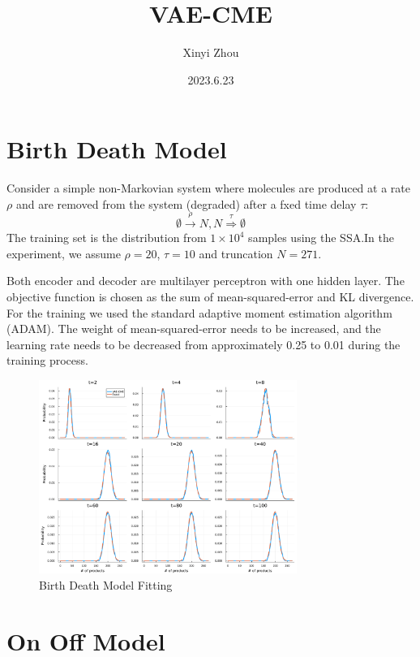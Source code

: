 \documentclass[a4paper,10pt]{article}
\title{VAE-CME}
\author{Xinyi Zhou}
\date{2023.6.23}
\begin{document}
\tableofcontents
\maketitle

\section{Birth Death Model}
Consider a simple non-Markovian system where molecules are produced at a rate $\rho$ and are removed from the system (degraded) after a fxed time delay $\tau$:
\begin{equation}\label{birth-death}
\emptyset\stackrel{\rho}\rightarrow N, N\stackrel{\tau}\Rightarrow\emptyset
\end{equation}
The training set is the distribution from $1 \times 10^4$ samples using the SSA.In the experiment, we assume $\rho=20$, $\tau=10$ and truncation $N=271$. 

Both encoder and decoder are multilayer perceptron with one hidden layer. The objective function is chosen as the sum of mean-squared-error and KL divergence. For the training we used the standard adaptive moment estimation algorithm (ADAM). The weight of mean-squared-error needs to be increased, and the learning rate needs to be decreased from approximately 0.25 to 0.01 during the training process.

\begin{figure}[h]
	\centering
	\includegraphics[width=0.75\textwidth]{Figs/Birth_Death_fitting.pdf}
	\caption{Birth Death Model Fitting}\label{Birth Death Model Fitting}  
\end{figure}

\section{On Off Model}
\end{document}
